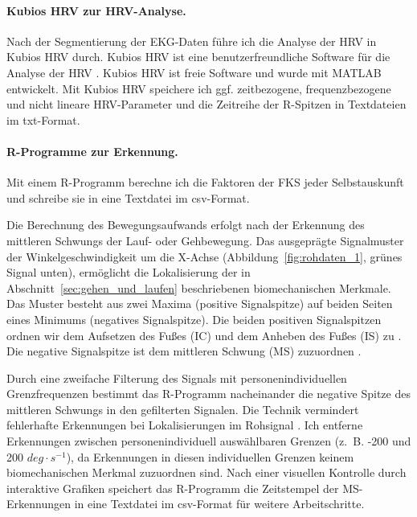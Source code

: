 \paragraph{Kubios HRV zur HRV-Analyse.} 

\label{par:kubios_hrv_zur_hrv_analyse}

Nach der Segmentierung der \ac{EKG}-Daten führe ich die Analyse der \ac{HRV} in Kubios HRV durch. Kubios HRV ist eine benutzerfreundliche Software für die Analyse der \ac{HRV} \citep{Tarvainen2014}. Kubios HRV ist freie Software und wurde mit MATLAB entwickelt. Mit Kubios HRV speichere ich ggf. zeitbezogene, frequenzbezogene und nicht lineare \ac{HRV}-Parameter und die Zeitreihe der R-Spitzen in Textdateien im txt-Format.

\paragraph{R-Programme zur Erkennung.} 

\label{par:r_programme_zur_erkennung}

Mit einem R-Programm berechne ich die Faktoren der \ac{FKS} jeder Selbstauskunft und schreibe sie in eine Textdatei im \acs{csv}-Format.

Die Berechnung des Bewegungsaufwands erfolgt nach der Erkennung des mittleren Schwungs der Lauf- oder Gehbewegung. Das ausgeprägte Signalmuster der Winkelgeschwindigkeit um die X-Achse (Abbildung~\ref{fig:rohdaten_1}, grünes Signal unten), ermöglicht die Lokalisierung der in Abschnitt~\ref{sec:gehen_und_laufen} beschriebenen biomechanischen Merkmale. Das Muster besteht aus zwei Maxima (positive Signalspitze) auf beiden Seiten eines Minimums (negatives Signalspitze). Die beiden positiven Signalspitzen ordnen wir dem Aufsetzen des Fußes (\ac{IC}) und dem Anheben des Fußes (\ac{IS}) zu \citep[][]{Aminian2002}. Die negative Signalspitze ist dem mittleren Schwung (\ac{MS}) zuzuordnen \citep[][]{Aminian2002}.

Durch eine zweifache Filterung des Signals mit personenindividuellen Grenzfrequenzen bestimmt das R-Programm nacheinander die negative Spitze des mittleren Schwungs in den gefilterten Signalen. Die Technik vermindert fehlerhafte Erkennungen bei Lokalisierungen im Rohsignal \citep[][]{Lee2011}. Ich entferne Erkennungen zwischen personenindividuell auswählbaren Grenzen (z.~B. -200 und 200 $deg \cdot s^{-1}$), da Erkennungen in diesen individuellen Grenzen keinem biomechanischen Merkmal zuzuordnen sind. Nach einer visuellen Kontrolle durch interaktive Grafiken speichert das R-Programm die Zeitstempel der \ac{MS}-Erkennungen in eine Textdatei im \acs{csv}-Format für weitere Arbeitschritte.

